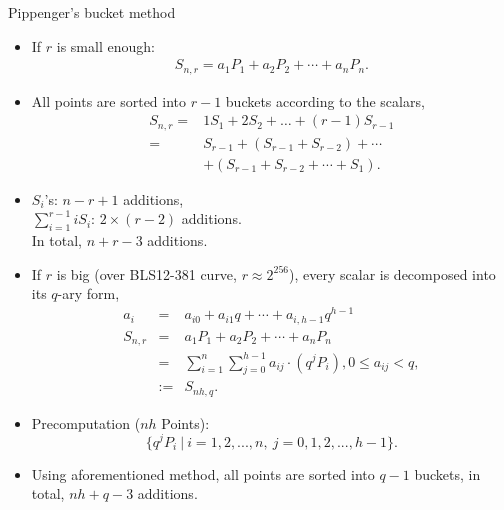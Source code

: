 \documentclass[final]{beamer}
\newlength{\onecolwid}
\begin{document}
\begin{frame}[t]
\begin{columns}[t]
\begin{column}{\onecolwid} 

\begin{block}{Pippenger's bucket method}
\small
	\begin{itemize}	
	\item If $r$ is small enough:
	\begin{eqnarray*}
	S_{n,r}= a_1P_1+a_2P_2+\cdots + a_nP_n.
	\end{eqnarray*}
	
	\item All points are sorted into $r-1$ buckets according to the scalars,
	\begin{equation*}
	\begin{aligned}
	S_{n,r}=& 1 S_{1}+2 S_{2}+\ldots+(r-1) S_{r-1}\\
	=& S_{r-1} + (S_{r-1}+S_{r-2})+\cdots\\
	&+(S_{r-1}+S_{r-2}+\cdots +S_1).
	\end{aligned}
	\end{equation*}
	
	\item $S_i$'s: $n - r + 1$ additions,\\
	$\sum_{i = 1}^{r-1} iS_i$: $2\times (r-2)$ additions.\\
	In total, $n+r -3$ additions.	
	\end{itemize}
			
	\begin{itemize}	
			\item If $r$ is big (over BLS12-381 curve, $r\approx 2^{256}$), every scalar is decomposed into its $q$-ary form,
			\begin{eqnarray*}
			a_i &=& a_{i0} + a_{i1}q +\cdots+ a_{i,h-1}q^{h-1} \\
			S_{n,r}&=& a_1P_1+a_2P_2+\cdots + a_nP_n\\
			&=&\sum _{i=1}^n\sum_{j=0}^{h-1}a_{ij}\cdot (q^{j}P_i), 0 \le a_{ij}< q,\\
			& :=& S_{nh,q}.
			\end{eqnarray*}
			
			\item Precomputation ($nh$ Points):
			\begin{equation*}
			\{q^{j}P_i\ |\ i= 1,2,...,n,\ j=0,1,2,...,h-1\}. 
			\end{equation*}
			
			\item Using aforementioned method, all points are sorted into $q-1$ buckets,
			in total, $nh+ q -3$ additions.
	\end{itemize}
\end{block}


\end{column}
\end{columns}
\end{frame}
\end{document}
